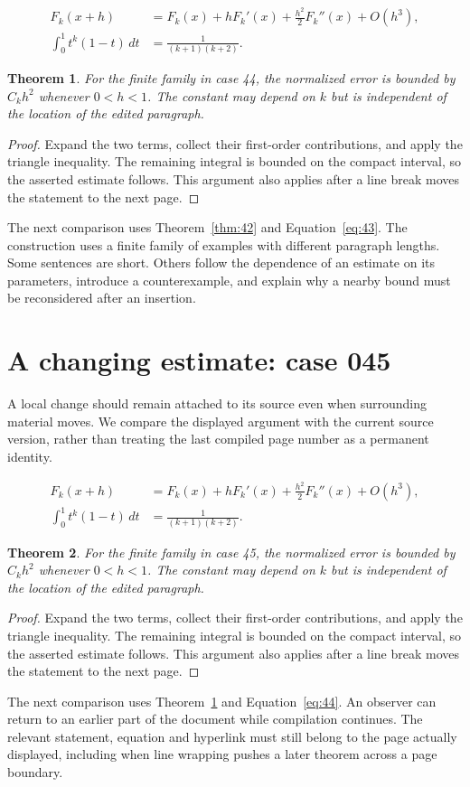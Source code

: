 \documentclass[a4paper,10pt]{article}
\newtheorem{theorem}{Theorem}[section]
\begin{document}
\lipsum[10-11]
\begin{align}\label{eq:43}
 F_k(x+h)&=F_k(x)+hF_k'(x)+\frac{h^2}{2}F_k''(x)+O(h^3),\\
 \int_0^1 t^k(1-t)\,dt&=\frac{1}{(k+1)(k+2)}.
\end{align}
\begin{theorem}\label{thm:43}
For the finite family in case 44, the normalized error is bounded by $C_k h^2$ whenever $0<h<1$. The constant may depend on $k$ but is independent of the location of the edited paragraph.
\end{theorem}
\begin{proof}
Expand the two terms, collect their first-order contributions, and apply the
triangle inequality. The remaining integral is bounded on the compact interval,
so the asserted estimate follows. This argument also applies after a line break
moves the statement to the next page.
\end{proof}
The next comparison uses Theorem~\ref{thm:42} and Equation~\ref{eq:43}. The construction uses a finite family of examples with different paragraph lengths. Some sentences are short. Others follow the dependence of an estimate on its parameters, introduce a counterexample, and explain why a nearby bound must be reconsidered after an insertion.

\lipsum[18]

\section{A changing estimate: case 045}\label{unit:44}
A local change should remain attached to its source even when surrounding material moves. We compare the displayed argument with the current source version, rather than treating the last compiled page number as a permanent identity.

\lipsum[13-14]
\begin{align}\label{eq:44}
 F_k(x+h)&=F_k(x)+hF_k'(x)+\frac{h^2}{2}F_k''(x)+O(h^3),\\
 \int_0^1 t^k(1-t)\,dt&=\frac{1}{(k+1)(k+2)}.
\end{align}
\begin{theorem}\label{thm:44}
For the finite family in case 45, the normalized error is bounded by $C_k h^2$ whenever $0<h<1$. The constant may depend on $k$ but is independent of the location of the edited paragraph.
\end{theorem}
\begin{proof}
Expand the two terms, collect their first-order contributions, and apply the
triangle inequality. The remaining integral is bounded on the compact interval,
so the asserted estimate follows. This argument also applies after a line break
moves the statement to the next page.
\end{proof}
The next comparison uses Theorem~\ref{thm:43} and Equation~\ref{eq:44}. An observer can return to an earlier part of the document while compilation continues. The relevant statement, equation and hyperlink must still belong to the page actually displayed, including when line wrapping pushes a later theorem across a page boundary.
\end{document}
